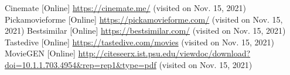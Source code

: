 \documentclass[conference]{IEEEtran}
\begin{document}
\begin{thebibliography}{0}
	Cinemate [Online] \url{https://cinemate.me/} (visited on Nov. 15, 2021)
	Pickamovieforme [Online] \url{https://pickamovieforme.com/} (visited on Nov. 15, 2021)
	Bestsimilar [Online] \url{https://bestsimilar.com/} (visited on Nov. 15, 2021)
	Tastedive [Online] \url{https://tastedive.com/movies} (visited on Nov. 15, 2021)
	MovieGEN [Online] \url{http://citeseerx.ist.psu.edu/viewdoc/download?doi=10.1.1.703.4954\&rep=rep1\&type=pdf} (visited on Nov. 15, 2021)
\end{thebibliography}
\vspace{12pt}
\end{document}
